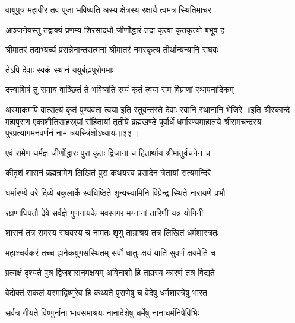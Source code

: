 \twolineshloka
{वायुपुत्र महावीर तव पूजा भविष्यति}
{अस्य क्षेत्रस्य रक्षायै त्वमत्र स्थितिमाचर}%

\twolineshloka
{आञ्जनेयस्तु तद्वाक्यं प्रणम्य शिरसादधौ}
{जीर्णोद्धारं तदा कृत्वा कृतकृत्यो बभूव ह}%

\twolineshloka
{श्रीमातरं तदाभ्यर्च्य प्रसन्नेनान्तरात्मना}
{श्रीमातरं नमस्कृत्य तीर्थान्यन्यानि राघवः}%

\onelineshloka
{तेऽपि देवाः स्वकं स्थानं ययुर्बह्मपुरोगमाः}%

\twolineshloka
{दत्त्वाशिषं तु रामाय वाञ्छितं ते भविष्यति}
{रम्यं कृतं त्वया राम विप्राणां स्थापनादिकम्}%

\twolineshloka
{अस्माकमपि वात्सल्यं कृतं पुण्यवता त्वया}
{इति स्तुवन्तस्ते देवाः स्वानि स्थानानि भेजिरे}%
॥इति श्रीस्कान्दे महापुराण एकाशीतिसाहस्र्यां संहितायां तृतीये ब्रह्मखण्डे पूर्वार्धे धर्मारण्यमाहात्म्ये श्रीरामचन्द्रस्य पुरप्रत्यागमनवर्णनं नाम त्रयस्त्रिंशोऽध्यायः॥३३॥

\resetShloka


\twolineshloka
{एवं रामेण धर्मज्ञ जीर्णोद्धारः पुरा कृतः}
{द्विजानां च हितार्थाय श्रीमातुर्वचनेन च}%


\twolineshloka
{कीदृशं शासनं ब्रह्मन्रामेण लिखितं पुरा}
{कथयस्व प्रसादेन त्रेतायां सत्यमन्दिरे}%


\twolineshloka
{धर्मारण्ये वरे दिव्ये बकुलार्के स्वधिष्ठिते}
{शून्यस्वामिनि विप्रेन्द्र स्थिते नारायणे प्रभौ}%

\twolineshloka
{रक्षणाधिपतौ देवे सर्वज्ञे गुणनायके}
{भवसागर मग्नानां तारिणी यत्र योगिनी}%

\twolineshloka
{शासनं तत्र रामस्य राघवस्य च नामतः}
{शृणु ताम्राश्रयं तत्र लिखितं धर्मशास्त्रतः}%

\twolineshloka
{महाश्चर्यकरं तच्च ह्यनेकयुगसंस्थितम्}
{सर्वो धातुः क्षयं याति सुवर्णं क्षयमेति च}%

\twolineshloka
{प्रत्यक्षं दृश्यते पुत्र द्विजशासनमक्षयम्}
{अविनाशो हि ताम्रस्य कारणं तत्र विद्यते}%

\twolineshloka
{वेदोक्तं सकलं यस्माद्विष्णुरेव हि कथ्यते}
{पुराणेषु च वेदेषु धर्मशास्त्रेषु भारत}%

\twolineshloka
{सर्वत्र गीयते विष्णुर्नाना भावसमाश्रयः}
{नानादेशेषु धर्मेषु नानाधर्मनिषेविभिः}%

